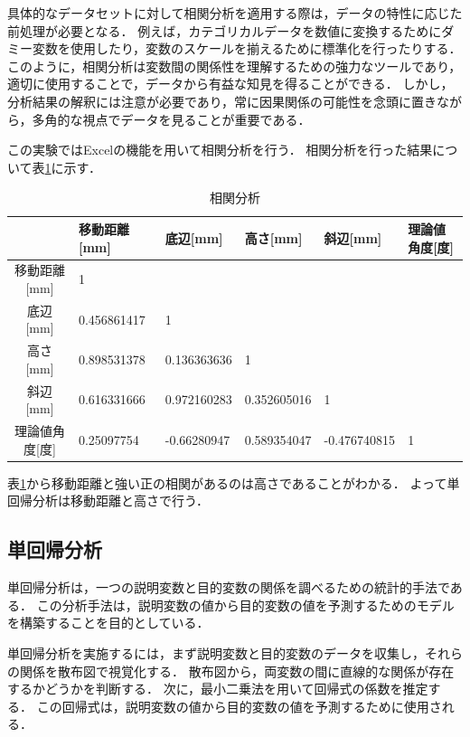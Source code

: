 \documentclass[titlepage,a4paper]{jsarticle}
\begin{document}
具体的なデータセットに対して相関分析を適用する際は，データの特性に応じた前処理が必要となる．
例えば，カテゴリカルデータを数値に変換するためにダミー変数を使用したり，変数のスケールを揃えるために標準化を行ったりする．
このように，相関分析は変数間の関係性を理解するための強力なツールであり，適切に使用することで，データから有益な知見を得ることができる．
しかし，分析結果の解釈には注意が必要であり，常に因果関係の可能性を念頭に置きながら，多角的な視点でデータを見ることが重要である．

この実験ではExcelの機能を用いて相関分析を行う．
相関分析を行った結果について表\ref{相関分析}に示す．
\begin{table}[H]
  \caption{相関分析}
  \label{相関分析}
  \begin{tabular}{c|lllll}
                 & 移動距離{[}mm{]} & 底辺{[}mm{]}  & 高さ{[}mm{]}  & 斜辺{[}mm{]}   & 理論値角度{[}度{]} \\\hline\hline
    移動距離{[}mm{]} & 1            &             &             &              &              \\
    底辺{[}mm{]}   & 0.456861417  & 1           &             &              &              \\
    高さ{[}mm{]}   & 0.898531378  & 0.136363636 & 1           &              &              \\
    斜辺{[}mm{]}   & 0.616331666  & 0.972160283 & 0.352605016 & 1            &              \\
    理論値角度{[}度{]} & 0.25097754   & -0.66280947 & 0.589354047 & -0.476740815 & 1            \\\hline
  \end{tabular}
\end{table}
表\ref{相関分析}から移動距離と強い正の相関があるのは高さであることがわかる．
よって単回帰分析は移動距離と高さで行う．


\subsection{単回帰分析}
単回帰分析は，一つの説明変数と目的変数の関係を調べるための統計的手法である．
この分析手法は，説明変数の値から目的変数の値を予測するためのモデルを構築することを目的としている．

単回帰分析を実施するには，まず説明変数と目的変数のデータを収集し，それらの関係を散布図で視覚化する．
散布図から，両変数の間に直線的な関係が存在するかどうかを判断する．
次に，最小二乗法を用いて回帰式の係数を推定する．
この回帰式は，説明変数の値から目的変数の値を予測するために使用される．
\end{document}
